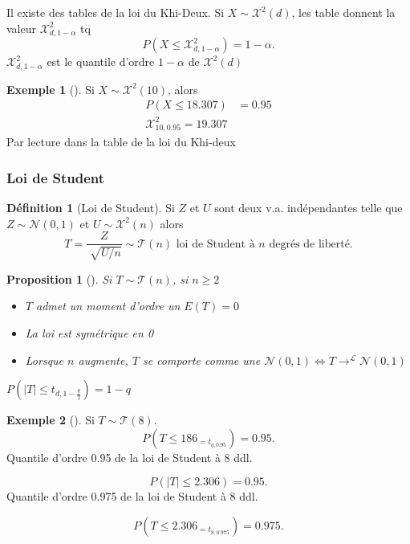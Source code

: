\documentclass{article}
\theoremstyle{plain}%
\newtheorem{prop}[thm]{Proposition}
\theoremstyle{definition}
\newtheorem{defn}{Définition}[section]
\newtheorem{exmp}{Exemple}[section]
\theoremstyle{remark}
\begin{document}
Il existe des tables de la loi du Khi-Deux. Si $ X \sim \mathcal{X}^2(d) $, les table donnent la valeur $ \mathcal{X}^2_{d, 1-\alpha } $ tq 
\[
    P(X \leq \mathcal{X}^2_{d, 1-\alpha }) = 1 - \alpha 
.\]
$ \mathcal{X}^2_{d, 1-\alpha } $ est le quantile d'ordre $ 1-\alpha  $ de $ \mathcal{X}^2(d) $ 
\begin{exmp}[]
    Si $ X \sim \mathcal{X}^2 (10) $, alors 
    \begin{align*}
        P(X \leq 18.307) &= 0.95 \\
        \mathcal{X}^2_{10, 0.95} = 19.307      
    \end{align*}
    Par lecture dans la table de la loi du Khi-deux
\end{exmp}

\subsubsection{Loi de Student}
\begin{defn}[Loi de Student]
    Si $ Z $ et $ U $ sont deux v.a. indépendantes telle que $ Z \sim \mathcal{N}(0,1) $ et $ U \sim \mathcal{X}^2(n) $ alors 
    \[
        T = \frac{Z}{\sqrt[]{U/n}} \sim \mathcal{T}(n) \text{ loi de Student à } n \text{ degrés de liberté}
    .\]
\end{defn}

\begin{prop}[]
    Si $ T \sim \mathcal{T}(n) $, si $ n \geq 2 $ 
    \begin{itemize}
        \item $ T $ admet un moment d'ordre un $ E(T) = 0 $
        \item La loi est symétrique en 0
        \item Lorsque $ n $ augmente, $ T $ se comporte comme une $ \mathcal{N}(0,1) \Leftrightarrow T \to^\mathcal{L} \mathcal{N}(0,1)$
    \end{itemize}
    $ P(\left| T \right| \leq t_{d, 1- \frac{q}{2}}) = 1 - q $ 
\end{prop}

\begin{exmp}[]
    Si $ T \sim \mathcal{T}(8) $. 
    \[
        P(T \leq 186_{=t_{q, 0.95}}) = 0.95
    .\]
    Quantile d'ordre 0.95 de la loi de Student à 8 ddl.
    
    \[
        P( \left| T \right|  \leq 2.306) = 0.95
    .\]
        Quantile d'ordre 0.975 de la loi de Student à 8 ddl.
        
        
    \[
        P( T  \leq 2.306_{=t_{8,0.975}}) = 0.975
    .\]
\end{exmp}
\end{document}
